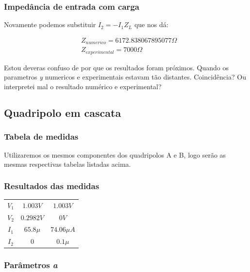 \documentclass[12pt,twoside, a4paper, twocolumn]{article}
\begin{document}
\subsubsection{Impedância de entrada com carga}


Novamente podemos substituir $I_2 = -I_1 Z_L$ que nos dá:


\begin{equation}
    \begin{aligned}
         & Z_{numerico} = 6172.838067895077 \varOmega \\
         & Z_{experimental} = 7000 \varOmega
    \end{aligned}
\end{equation}


Estou deveras confuso de por que os resultados foram próximos. Quando os parametros \emph{y} numericos e experimentais estavam tão distantes. Coincidência? Ou interpretei mal o resultado numérico e experimental?


\subsection{Quadripolo em cascata}


\subsubsection{Tabela de medidas}


Utilizaremos os mesmos componentes  dos quadripolos A e B, logo serão as mesmas respectivas tabelas listadas acima.


\subsubsection{Resultados das medidas}


\begin{center}
    \begin{tabular}{ |c|c|c| }
        \hline
        $V_1$ & $1.003V$   & $1.003 V$     \\
        $V_2$ & $0.2982 V$ & $0 V$         \\
        $I_1$ & $65.8 \mu$ & $74.06 \mu A$ \\
        $I_2$ & $0$        & $0.1 \mu$     \\
        \hline
    \end{tabular}
\end{center}


\subsubsection{Parâmetros \emph{a}}
\end{document}
